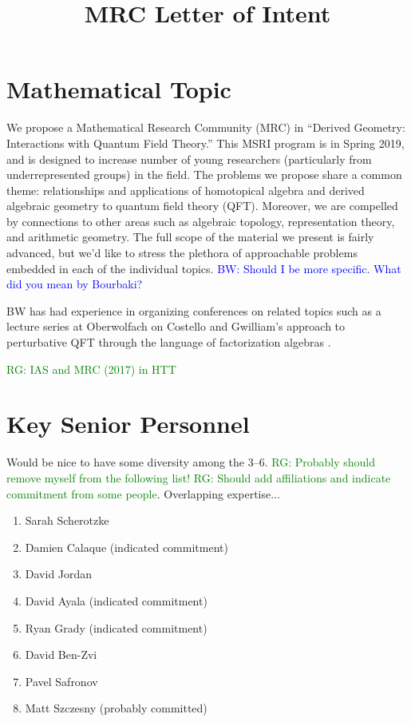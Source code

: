 \documentclass[11pt]{amsart}
\title{MRC Letter of Intent}
\def\brian{\textcolor{blue}{BW: }\textcolor{blue}}
\def\ryan{\textcolor{green}{RG: }\textcolor{green}}
\begin{document}
\maketitle

\section*{Mathematical Topic}

We propose a Mathematical Research Community (MRC) in ``Derived Geometry: Interactions with Quantum Field Theory.'' This MSRI program is in Spring 2019, and is designed to increase number of young researchers (particularly from underrepresented groups) in the field. 
The problems we propose share a common theme: relationships and applications of homotopical algebra and derived algebraic geometry to quantum field theory (QFT). 
Moreover, we are compelled by connections to other areas such as algebraic topology, representation theory, and arithmetic geometry. 
The full scope of the material we present is fairly advanced, but we'd like to stress the plethora of approachable problems embedded in each of the individual topics.
\brian{Should I be more specific. What did you mean by Bourbaki?}

BW has had experience in organizing conferences on related topics such as a lecture series at Oberwolfach on Costello and Gwilliam's approach to perturbative QFT through the language of factorization algebras \cite{oberwolfach}. 

\ryan{IAS
and MRC (2017) in HTT}

\section*{Key Senior Personnel} Would be nice to have some diversity among the 3--6. \ryan{Probably should remove myself from the following list!} \ryan{Should add affiliations and indicate commitment from some people}. Overlapping expertise...

\begin{enumerate}
\item \label{Sarah} Sarah Scherotzke
\item \label{Damien} Damien Calaque (indicated commitment)
\item \label{DavidJ} David Jordan
\item \label{DavidA} David Ayala (indicated commitment)
\item \label{Ryan} Ryan Grady (indicated commitment)
\item \label{DavidBZ} David Ben-Zvi
\item \label{PavelS} Pavel Safronov
\item \label{Matt} Matt Szczesny (probably committed)
\end{enumerate}
\end{document}
